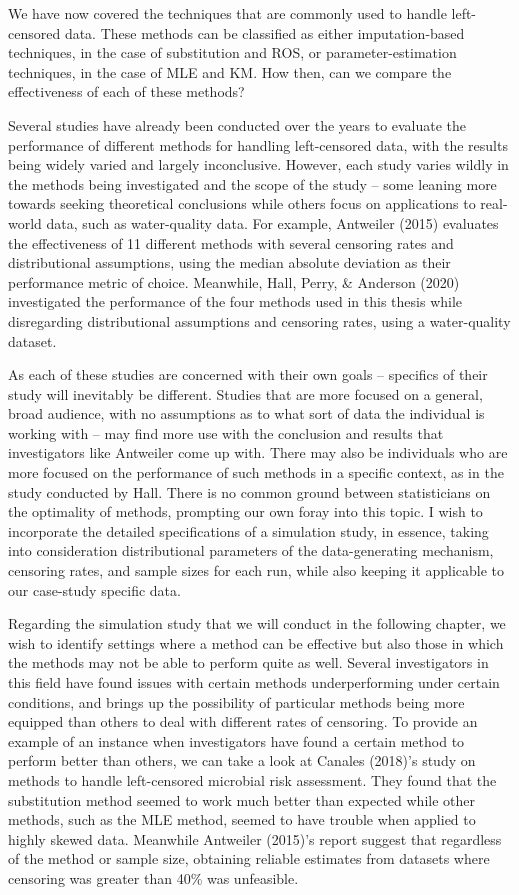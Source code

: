 \documentclass[12pt, twoside]{amherstthesis}
\begin{document}
We have now covered the techniques that are commonly used to handle left-censored data. These methods can be classified as either imputation-based techniques, in the case of substitution and ROS, or parameter-estimation techniques, in the case of MLE and KM. How then, can we compare the effectiveness of each of these methods?

Several studies have already been conducted over the years to evaluate the performance of different methods for handling left-censored data, with the results being widely varied and largely inconclusive. However, each study varies wildly in the methods being investigated and the scope of the study -- some leaning more towards seeking theoretical conclusions while others focus on applications to real-world data, such as water-quality data. For example, Antweiler (2015) evaluates the effectiveness of 11 different methods with several censoring rates and distributional assumptions, using the median absolute deviation as their performance metric of choice. Meanwhile, Hall, Perry, \& Anderson (2020) investigated the performance of the four methods used in this thesis while disregarding distributional assumptions and censoring rates, using a water-quality dataset.

As each of these studies are concerned with their own goals -- specifics of their study will inevitably be different. Studies that are more focused on a general, broad audience, with no assumptions as to what sort of data the individual is working with -- may find more use with the conclusion and results that investigators like Antweiler come up with. There may also be individuals who are more focused on the performance of such methods in a specific context, as in the study conducted by Hall. There is no common ground between statisticians on the optimality of methods, prompting our own foray into this topic. I wish to incorporate the detailed specifications of a simulation study, in essence, taking into consideration distributional parameters of the data-generating mechanism, censoring rates, and sample sizes for each run, while also keeping it applicable to our case-study specific data.

Regarding the simulation study that we will conduct in the following chapter, we wish to identify settings where a method can be effective but also those in which the methods may not be able to perform quite as well. Several investigators in this field have found issues with certain methods underperforming under certain conditions, and brings up the possibility of particular methods being more equipped than others to deal with different rates of censoring. To provide an example of an instance when investigators have found a certain method to perform better than others, we can take a look at Canales (2018)'s study on methods to handle left-censored microbial risk assessment. They found that the substitution method seemed to work much better than expected while other methods, such as the MLE method, seemed to have trouble when applied to highly skewed data. Meanwhile Antweiler (2015)'s report suggest that regardless of the method or sample size, obtaining reliable estimates from datasets where censoring was greater than 40\% was unfeasible.
\end{document}
